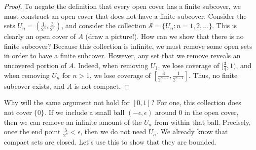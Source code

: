 \documentclass[11pt]{article}
\renewcommand{\S}{\ensuremath{\mathcal S}}
\newcommand{\e}{\epsilon}
\theoremstyle{plain}
\theoremstyle{definition}
\theoremstyle{remark}
\begin{document}
\begin{proof}
    To negate the definition that every open cover has a finite subcover, we must construct an open cover that does not have a finite subcover. Consider the sets $U_n = (\frac{1}{2^n}, \frac{3}{2^n})$, and consider the collection $\S = \{U_n: n = 1, 2, ...\}$. This is clearly an open cover of $A$ (draw a picture!). How can we show that there is no finite subcover? Because this collection is infinite, we must remove some open sets in order to have a finite subcover. However, any set that we remove reveals an uncovered portion of $A$. Indeed, when removing $U_1$, we lose coverage of $[\frac{3}{4}, 1)$, and when removing $U_n$ for $n > 1$, we lose coverage of $[\frac{3}{2^{n+1}}, \frac{1}{2^{n-1}}]$. Thus, no finite subcover exists, and $A$ is not compact. 
\end{proof}
Why will the same argument not hold for $[0, 1]$? For one, this collection does not cover $\{0\}$. If we include a small ball $(-\e, \e)$ around 0 in the open cover, then we can remove an infinite amount of the $U_n$ from within that ball. Precisely, once the end point $\frac{3}{2^n} < \e$, then we do not need $U_n$. We already know that compact sets are closed. Let's use this to show that they are bounded.
\end{document}
